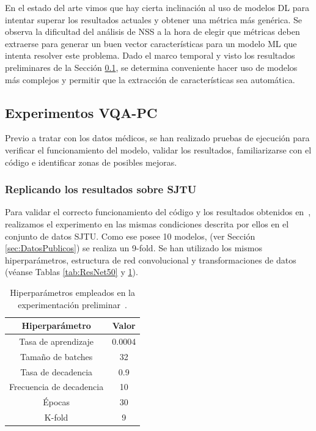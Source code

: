 En el estado del arte vimos que hay cierta inclinación al uso de modelos 
DL para intentar superar los resultados actuales y obtener una métrica más 
genérica. Se observa la dificultad del análisis de NSS a la hora de elegir que métricas 
deben extraerse para generar un buen vector características para un modelo ML 
que intenta resolver este problema. Dado el marco temporal y visto los 
resultados preliminares de la Sección \ref{sec:PreResults}, se determina 
conveniente hacer uso de modelos más complejos y permitir que la extracción 
de características sea automática. 

\subsection{Experimentos VQA-PC}
\label{sec:PreResults}
Previo a tratar con los datos médicos, se han realizado pruebas de ejecución 
para verificar el funcionamiento del modelo, validar los resultados, familiarizarse 
con el código e identificar zonas de posibles mejoras.

\subsubsection{Replicando los resultados sobre SJTU}
\label{sec:VQAPCSJTU}
Para validar el correcto funcionamiento del código y los resultados obtenidos 
en~\cite{VQA-PC}, realizamos el experimento en las mismas condiciones descrita 
por ellos en el conjunto de datos SJTU. Como ese posee 10 modelos, 
(ver Sección \ref{sec:DatosPublicos}) se realiza un 9-fold. Se han utilizado 
los mismos hiperparámetros, estructura de red convolucional y transformaciones 
de datos (véanse Tablas \ref{tab:ResNet50} y \ref{tab:HiperSJTU}). 

\begin{table}[htp]
  \scriptsize
  \begin{center}
    \begin{tabular}[c]{|c|c|}
      \hline
      \rowcolor[HTML]{FFC702}
      \textbf{Hiperparámetro} & \textbf{Valor} \\ 
      \hline 
      Tasa de aprendizaje &  0.0004 \\ 
      \hline 
      Tamaño de batches & 32 \\ 
      \hline 
      Tasa de decadencia & 0.9 \\ 
      \hline 
      Frecuencia de decadencia & 10 \\ 
      \hline 
      Épocas & 30 \\ 
      \hline 
      K-fold & 9 \\ 
      \hline 
    \end{tabular}
  \end{center}
  \caption[Hiperparámetros empleados en la experimentación preliminar.]{
    Hiperparámetros empleados en la experimentación preliminar~\cite{VQA-PC}.
  }
  \label{tab:HiperSJTU}
\end{table}

